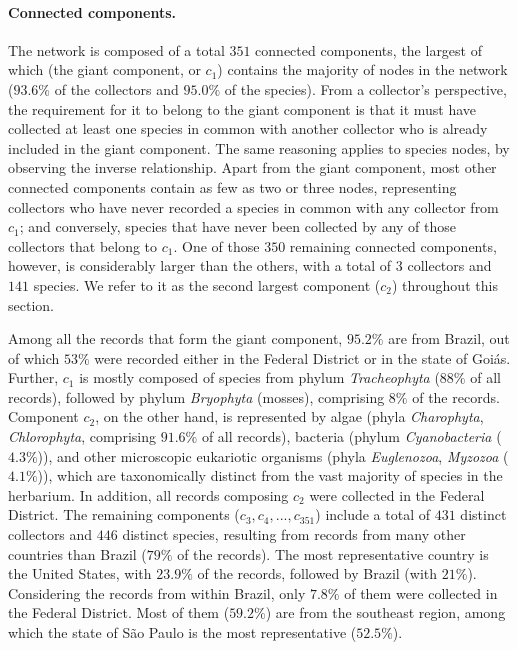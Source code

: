 \paragraph{Connected components.}
The network is composed of a total $351$ connected components, the largest of which (the giant component, or $c_1$) contains the majority of nodes in the network ($93.6\%$ of the collectors and $95.0\%$ of the species). 
From a collector's perspective, the requirement for it to belong to the giant component is that it must have collected at least one species in common with another collector who is already included in the giant component. The same reasoning applies to species nodes, by observing the inverse relationship.
Apart from the giant component, most other connected components contain as few as two or three nodes, representing collectors who have never recorded a species in common with any collector from $c_1$; and conversely, species that have never been collected by any of those collectors that belong to $c_1$.
One of those $350$ remaining connected components, however, is considerably larger than the others, with a total of $3$ collectors and $141$ species. We refer to it as the second largest component ($c_2$) throughout this section.

Among all the records that form the giant component, $95.2\%$ are from Brazil, out of which $53\%$ were recorded either in the Federal District or in the state of Goiás. 
Further, $c_1$ is mostly composed of species from phylum \textit{Tracheophyta} ($88\%$ of all records), followed by phylum \textit{Bryophyta} (mosses), comprising $8\%$ of the records. 
Component $c_2$, on the other hand, is represented by algae (phyla \textit{Charophyta}, \textit{Chlorophyta}, comprising $91.6\%$ of all records), bacteria (phylum \textit{Cyanobacteria} ($4.3\%$)), and other microscopic eukariotic organisms (phyla \textit{Euglenozoa}, \textit{Myzozoa} ($4.1\%$)), which are taxonomically distinct from the vast majority of species in the herbarium.
In addition, all records composing $c_2$ were collected in the Federal District.
The remaining components ($c_3,c_4,..., c_{351}$) include a total of $431$ distinct collectors and $446$ distinct species, resulting from records from many other countries than Brazil ($79\%$ of the records).
The most representative country is the United States, with $23.9\%$ of the records, followed by Brazil (with $21\%$). 
Considering the records from within Brazil, only $7.8\%$ of them were collected in the Federal District. Most of them ($59.2\%$) are from the southeast region, among which the state of São Paulo is the most representative ($52.5\%$).

